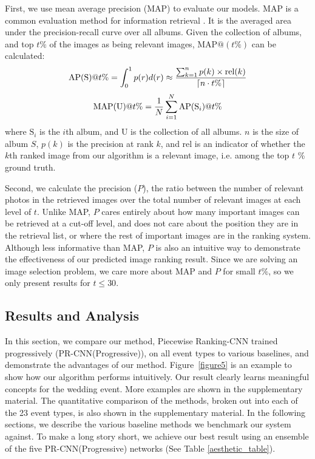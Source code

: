 \documentclass[10pt,twocolumn,letterpaper]{article}
\begin{document}
First, we use mean average precision (MAP) to evaluate our models. MAP is a common evaluation method for information retrieval \cite{MAP}. It is the averaged area under the precision-recall curve over all albums. Given the collection of albums, and top $t\%$ of the images as being relevant images, $\text{MAP}@(t\%)$ can be calculated:
\begin{equation}
\textup{AP(S)}@t\%=\int_{0}^{1}p(r)d(r)\approx \frac{\sum_{k=1}^{n}p(k)\times \textup{rel}(k)}{\left \lceil n\cdot t\% \right \rceil}
\end{equation}
\begin{equation}
\textup{MAP(U)}@t\% = \frac{1}{N}\sum_{i=1}^{N}\textup{AP}(\textup{S}_{i})@t\%
\end{equation}
where $\text{S}_{i}$ is the $i$th album, and $\text{U}$ is the collection of all albums. $n$ is the size of album $S$,  $p(k)$ is the precision at rank $k$, and $\text{rel}$ is an indicator of whether the $k$th ranked image from our algorithm is a relevant image, i.e. among the top $t$
\% ground truth.

Second, we calculate the precision ($P$), the ratio between the number of relevant photos in the retrieved images over the total number of relevant images at each level of $t$. Unlike MAP, $P$ cares entirely about how many important images can be retrieved at a cut-off level, and does not care about the position they are in the retrieval list, or where the rest of important images are in the ranking system. Although less informative than MAP, $P$ is also an intuitive way to demonstrate the effectiveness of our predicted image ranking result. Since we are solving an image selection problem, we care more about MAP and $P$ for small $t\%$, so we only present results for $t \leq 30$.

\subsection{Results and Analysis}
In this section, we compare our method, Piecewise Ranking-CNN trained progressively (PR-CNN(Progressive)), on all event types to various baselines, and demonstrate the advantages of our method. 
Figure~\ref{figure5} is an example to show how our algorithm performs intuitively. Our result clearly learns meaningful concepts for the wedding event. More examples are shown in the supplementary material. The quantitative comparison of the methods, broken out into each of the 23 event types, is also shown in the supplementary material.  In the following sections, we describe the various baseline methods we benchmark our system against. To make a long story short, we achieve our best result using an ensemble of the five PR-CNN(Progressive) networks (See Table \ref{aesthetic_table}).
  
\end{document}
